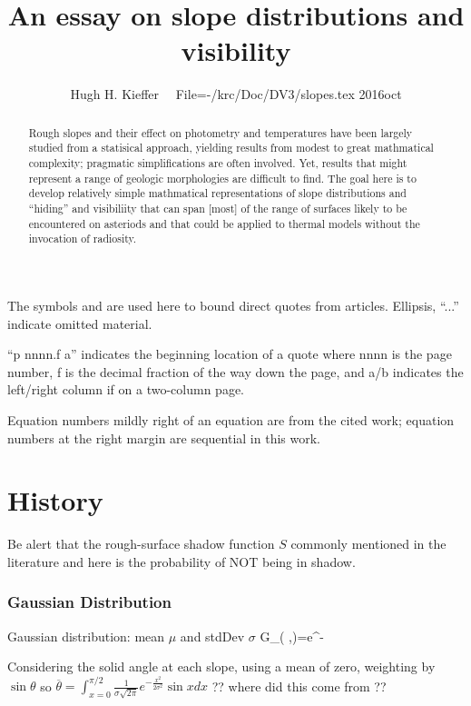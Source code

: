 \documentclass{article}
\title{An essay on slope distributions and visibility}
\author{Hugh H. Kieffer  \ \ File=-/krc/Doc/DV3/slopes.tex  2016oct}
\begin{document}
\maketitle
\tableofcontents
\listoffigures
\begin{abstract}
 Rough slopes and their effect on photometry and temperatures have been largely
 studied from a statisical approach, yielding results from modest to great
 mathmatical complexity; pragmatic simplifications are often involved. Yet,
 results that might represent a range of geologic morphologies are difficult to
 find. The goal here is to develop relatively simple mathmatical representations
 of slope distributions and ``hiding'' and visibiliity that can span [most] of
 the range of surfaces likely to be encountered on asteriods and that could
 be applied to thermal models without the invocation of radiosity.
\end{abstract}

The symbols \bq and \eq are used here to bound direct quotes from
articles. Ellipsis, ``...'' indicate omitted material.

``p nnnn.f a'' indicates the beginning location of a quote where nnnn is the
page number, f is the decimal fraction of the way down the page, and a/b
indicates the left/right column if on a two-column page.

Equation numbers mildly right of an equation are from the cited work; equation
numbers at the right margin are sequential in this work.

\section{History}

Be alert that the rough-surface shadow function $S$ commonly mentioned in the literature and here is the probability of NOT being in shadow.

\subsubsection{Gaussian Distribution}

Gaussian distribution: mean $\mu$ and stdDev $\sigma$
\qb G_{( \sigma,\mu )}=e^{-} \qe


Considering the solid angle at each slope, using a mean of zero, 
weighting by $\sin \theta$ 
so $\overline{\theta}=\int_{x=0}^{\pi/2} \frac{1}{\sigma \sqrt{2 \pi}}e^{-\frac{x^2}{2 \sigma^2}} \sin x dx $  ?? where did this come from ??
\end{document}
